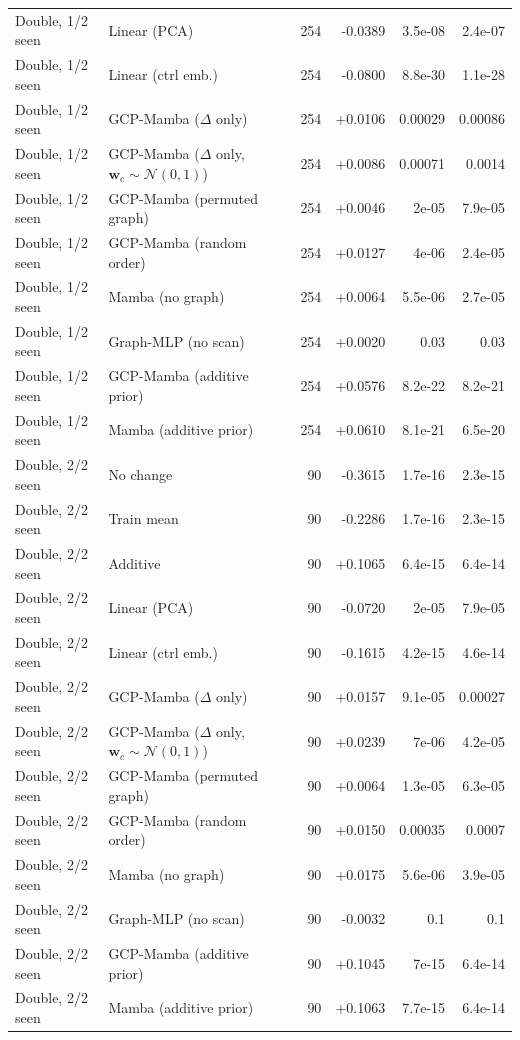 \begin{longtable}{llrrrr}
Double, 1/2 seen & Linear (PCA) & 254 & -0.0389 & 3.5e-08 & 2.4e-07 \\
Double, 1/2 seen & Linear (ctrl emb.) & 254 & -0.0800 & 8.8e-30 & 1.1e-28 \\
Double, 1/2 seen & GCP-Mamba ($\Delta$ only) & 254 & +0.0106 & 0.00029 & 0.00086 \\
Double, 1/2 seen & GCP-Mamba ($\Delta$ only, $\mathbf{w}_c\sim\mathcal{N}(0,1)$) & 254 & +0.0086 & 0.00071 & 0.0014 \\
Double, 1/2 seen & GCP-Mamba (permuted graph) & 254 & +0.0046 & 2e-05 & 7.9e-05 \\
Double, 1/2 seen & GCP-Mamba (random order) & 254 & +0.0127 & 4e-06 & 2.4e-05 \\
Double, 1/2 seen & Mamba (no graph) & 254 & +0.0064 & 5.5e-06 & 2.7e-05 \\
Double, 1/2 seen & Graph-MLP (no scan) & 254 & +0.0020 & 0.03 & 0.03 \\
Double, 1/2 seen & GCP-Mamba (additive prior) & 254 & +0.0576 & 8.2e-22 & 8.2e-21 \\
Double, 1/2 seen & Mamba (additive prior) & 254 & +0.0610 & 8.1e-21 & 6.5e-20 \\
\midrule
Double, 2/2 seen & No change & 90 & -0.3615 & 1.7e-16 & 2.3e-15 \\
Double, 2/2 seen & Train mean & 90 & -0.2286 & 1.7e-16 & 2.3e-15 \\
Double, 2/2 seen & Additive & 90 & +0.1065 & 6.4e-15 & 6.4e-14 \\
Double, 2/2 seen & Linear (PCA) & 90 & -0.0720 & 2e-05 & 7.9e-05 \\
Double, 2/2 seen & Linear (ctrl emb.) & 90 & -0.1615 & 4.2e-15 & 4.6e-14 \\
Double, 2/2 seen & GCP-Mamba ($\Delta$ only) & 90 & +0.0157 & 9.1e-05 & 0.00027 \\
Double, 2/2 seen & GCP-Mamba ($\Delta$ only, $\mathbf{w}_c\sim\mathcal{N}(0,1)$) & 90 & +0.0239 & 7e-06 & 4.2e-05 \\
Double, 2/2 seen & GCP-Mamba (permuted graph) & 90 & +0.0064 & 1.3e-05 & 6.3e-05 \\
Double, 2/2 seen & GCP-Mamba (random order) & 90 & +0.0150 & 0.00035 & 0.0007 \\
Double, 2/2 seen & Mamba (no graph) & 90 & +0.0175 & 5.6e-06 & 3.9e-05 \\
Double, 2/2 seen & Graph-MLP (no scan) & 90 & -0.0032 & 0.1 & 0.1 \\
Double, 2/2 seen & GCP-Mamba (additive prior) & 90 & +0.1045 & 7e-15 & 6.4e-14 \\
Double, 2/2 seen & Mamba (additive prior) & 90 & +0.1063 & 7.7e-15 & 6.4e-14 \\
\bottomrule
\end{longtable}

